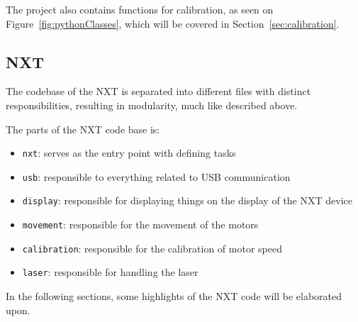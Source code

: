 The project also contains functions for calibration, as seen on Figure~\ref{fig:pythonClasses}, which will be covered in Section~\ref{sec:calibration}.


\subsection{NXT}
The codebase of the NXT is separated into different files with distinct responsibilities, resulting in modularity, much like described above.

The parts of the NXT code base is:
\begin{itemize}
	\item \texttt{nxt}: serves as the entry point with defining tasks
	\item \texttt{usb}: responsible to everything related to USB communication
	\item \texttt{display}: responsible for displaying things on the display of the NXT device
	\item \texttt{movement}: responsible for the movement of the motors
	\item \texttt{calibration}: responsible for the calibration of motor speed
	\item \texttt{laser}: responsible for handling the laser
\end{itemize}

In the following sections, some highlights of the NXT code will be elaborated upon.